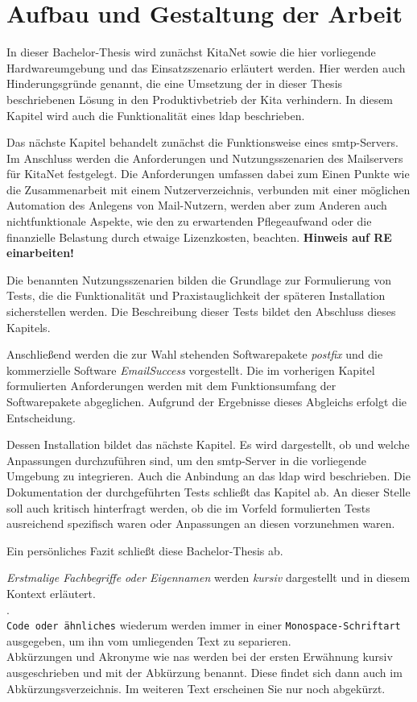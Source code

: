 \section{Aufbau und Gestaltung der Arbeit}

In dieser Bachelor-Thesis wird zunächst KitaNet sowie die hier vorliegende Hardwareumgebung und das Einsatzszenario erläutert werden. Hier werden auch Hinderungsgründe genannt, die eine Umsetzung der in dieser Thesis beschriebenen Lösung in den Produktivbetrieb der Kita verhindern. In diesem Kapitel wird auch die Funktionalität eines \ac{ldap} beschrieben.

Das nächste Kapitel behandelt zunächst die Funktionsweise eines \ac{smtp}-Servers. Im Anschluss werden die Anforderungen und Nutzungsszenarien des Mailservers für KitaNet festgelegt. Die Anforderungen umfassen dabei zum Einen Punkte wie die Zusammenarbeit mit einem Nutzerverzeichnis, verbunden mit einer möglichen Automation des Anlegens von Mail-Nutzern, werden aber zum Anderen auch nichtfunktionale Aspekte, wie den zu erwartenden Pflegeaufwand oder die finanzielle Belastung durch etwaige Lizenzkosten, beachten. \textbf{Hinweis auf RE einarbeiten!}

Die benannten Nutzungsszenarien bilden die Grundlage zur Formulierung von Tests, die die Funktionalität und Praxistauglichkeit der späteren Installation sicherstellen werden. Die Beschreibung dieser Tests bildet den Abschluss  dieses Kapitels.

Anschließend werden die zur Wahl stehenden Softwarepakete \textit{postfix} und die kommerzielle Software \textit{EmailSuccess} vorgestellt. Die im vorherigen Kapitel formulierten Anforderungen werden mit dem Funktionsumfang der Softwarepakete abgeglichen. Aufgrund der Ergebnisse dieses Abgleichs erfolgt die Entscheidung. 

Dessen Installation bildet das nächste Kapitel. Es wird dargestellt, ob und welche Anpassungen durchzuführen sind, um den \ac{smtp}-Server in die vorliegende Umgebung zu integrieren. Auch die Anbindung an das \ac{ldap} wird beschrieben.
Die Dokumentation der durchgeführten Tests schließt das Kapitel ab. An dieser Stelle soll auch kritisch hinterfragt werden, ob die im Vorfeld formulierten Tests ausreichend spezifisch waren oder Anpassungen an diesen vorzunehmen waren.

Ein persönliches Fazit schließt diese Bachelor-Thesis ab.

\textit{Erstmalige Fachbegriffe oder Eigennamen } werden \textit{kursiv} dargestellt und in diesem Kontext erläutert.  \\ . \\ \verb+Code oder ähnliches+ wiederum werden immer in einer \verb+Monospace-Schriftart+ ausgegeben, um ihn vom umliegenden Text zu separieren. \\ Abkürzungen und Akronyme wie \zb \ac{nas} werden bei der ersten Erwähnung kursiv ausgeschrieben und mit der Abkürzung benannt. Diese findet sich dann auch im Abkürzungsverzeichnis. Im weiteren Text erscheinen Sie nur noch abgekürzt. 

